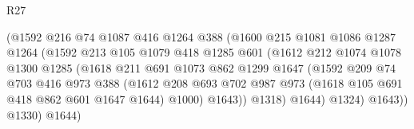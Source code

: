 \begin{lexlean}{R27}
\begin{coremodule}
                                  (@1592
                                    @216
                                    @74
                                    @1087
                                    @416
                                    @1264
                                    @388
                                    (@1600
                                      @215
                                      @1081
                                      @1086
                                      @1287
                                      @1264
                                      (@1592
                                        @213
                                        @105
                                        @1079
                                        @418
                                        @1285
                                        @601
                                        (@1612
                                          @212
                                          @1074
                                          @1078
                                          @1300
                                          @1285
                                          (@1618
                                            @211
                                            @691
                                            @1073
                                            @862
                                            @1299
                                            @1647
                                            (@1592
                                              @209
                                              @74
                                              @703
                                              @416
                                              @973
                                              @388
                                              (@1612
                                                @208
                                                @693
                                                @702
                                                @987
                                                @973
                                                (@1618 @105 @691 @418 @862 @601 @1647 @1644)
                                                @1000)
                                              @1643))
                                          @1318)
                                        @1644)
                                      @1324)
                                    @1643))
                                @1330)
                              @1644)

\end{coremodule}
\end{lexlean}

